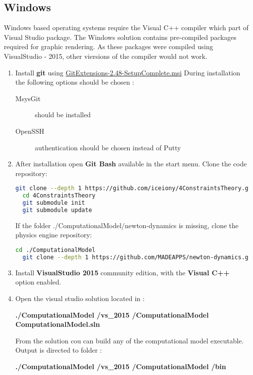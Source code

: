 \documentclass{article}
\begin{document}
\subsection{Windows}
Windows based operating systems require the Visual C++ compiler which part of Visual Studio package.
The Windows solution contains pre-compiled packages required for graphic rendering. 
As these packages were compiled using VisualStudio - 2015, other viersions of the compiler would not work.   
\begin{enumerate}

  \item Install \textbf{git} using 
    \href{https://github.com/gitextensions/gitextensions/releases/latest}{GitExtensions-2.48-SetupComplete.msi} 
    During installation the following options should be chosen : 
    \begin{description}
	\item [MsysGit] should be installed 
	\item [OpenSSH] authentication should be chosen instead of Putty
    \end{description}

  \item After installation open \textbf{Git Bash} available in the start menu. Clone the code repository:   
    \begin{lstlisting}[language=bash]
  git clone --depth 1 https://github.com/iceiony/4ConstraintsTheory.git 
  cd 4ConstraintsTheory
  git submodule init
  git submodule update
    \end{lstlisting}

    If the folder ./ComputationalModel/newton-dynamics is missing, clone the physics engine repository:
    \begin{lstlisting}[language=bash]
  cd ./ComputationalModel
  git clone --depth 1 https://github.com/MADEAPPS/newton-dynamics.git 
    \end{lstlisting}

  \item Install \textbf{VisualStudio 2015} community edition, with the \textbf{Visual C++} option enabled. 
  
  \item Open the visual studio solution located in : 
    
    \textbf{./ComputationalModel  /vs\_2015  /ComputationalModel  ComputationalModel.sln}
    
    From the solution cou can build any of the computational model executable.
    Output is directed to folder :
    
    \textbf{./ComputationalModel /vs\_2015 /ComputationalModel /bin} 

\end{enumerate}
\end{document}
